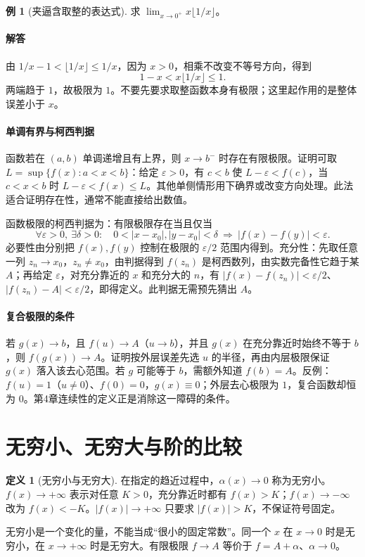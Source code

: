 \documentclass[UTF8,fontset=fandol,12pt,oneside,openany]{ctexrep}
\theoremstyle{definition}
\newtheorem{definition}[theorem]{定义}
\newtheorem{example}{例}[chapter]
\begin{document}
\begin{example}[夹逼含取整的表达式]
求 $\lim_{x\to0^+}x\lfloor1/x\rfloor$。
\end{example}
\paragraph{解答}由 $1/x-1<\lfloor1/x\rfloor\le1/x$，因为 $x>0$，相乘不改变不等号方向，得到
\[
1-x<x\lfloor1/x\rfloor\le1.
\]
两端趋于 $1$，故极限为 $1$。不要先要求取整函数本身有极限；这里起作用的是整体误差小于 $x$。

\paragraph{单调有界与柯西判据}
函数若在 $(a,b)$ 单调递增且有上界，则 $x\to b^-$ 时存在有限极限。证明可取 $L=\sup\{f(x):a<x<b\}$：给定 $\varepsilon>0$，有 $c<b$ 使 $L-\varepsilon<f(c)$，当 $c<x<b$ 时 $L-\varepsilon<f(x)\le L$。其他单侧情形用下确界或改变方向处理。此法适合证明存在性，通常不能直接给出数值。

函数极限的柯西判据为：有限极限存在当且仅当
\[
\forall\varepsilon>0,\ \exists\delta>0:\quad
0<|x-x_0|,|y-x_0|<\delta\ \Longrightarrow\ |f(x)-f(y)|<\varepsilon.
\]
必要性由分别把 $f(x),f(y)$ 控制在极限的 $\varepsilon/2$ 范围内得到。充分性：先取任意一列 $z_n\to x_0$，$z_n\ne x_0$，由判据得到 $f(z_n)$ 是柯西数列，由实数完备性它趋于某 $A$；再给定 $\varepsilon$，对充分靠近的 $x$ 和充分大的 $n$，有 $|f(x)-f(z_n)|<\varepsilon/2$、$|f(z_n)-A|<\varepsilon/2$，即得定义。此判据无需预先猜出 $A$。

\paragraph{复合极限的条件}
若 $g(x)\to b$，且 $f(u)\to A$（$u\to b$），并且 $g(x)$ 在充分靠近时始终不等于 $b$，则 $f(g(x))\to A$。证明按外层误差先选 $u$ 的半径，再由内层极限保证 $g(x)$ 落入该去心范围。若 $g$ 可能等于 $b$，需额外知道 $f(b)=A$。反例：$f(u)=1$（$u\ne0$）、$f(0)=0$，$g(x)\equiv0$；外层去心极限为 $1$，复合函数却恒为 $0$。第4章连续性的定义正是消除这一障碍的条件。

\section{无穷小、无穷大与阶的比较}
\label{lec:03:orders}
\begin{definition}[无穷小与无穷大]
在指定的趋近过程中，$\alpha(x)\to0$ 称为无穷小。$f(x)\to+\infty$ 表示对任意 $K>0$，充分靠近时都有 $f(x)>K$；$f(x)\to-\infty$ 改为 $f(x)<-K$。$|f(x)|\to+\infty$ 只要求 $|f(x)|>K$，不保证符号固定。
\end{definition}
无穷小是一个变化的量，不能当成“很小的固定常数”。同一个 $x$ 在 $x\to0$ 时是无穷小，在 $x\to+\infty$ 时是无穷大。有限极限 $f\to A$ 等价于 $f=A+\alpha$、$\alpha\to0$。
\end{document}
